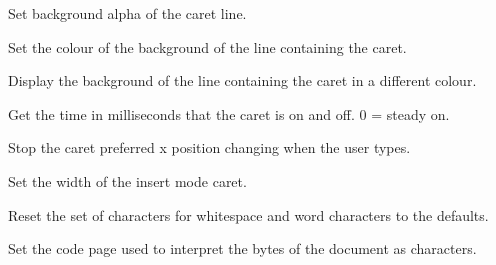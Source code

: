 
Set background alpha of the caret line.


\label{wxstyledtextctrlsetcaretlinebackground}


Set the colour of the background of the line containing the caret.


\label{wxstyledtextctrlsetcaretlinevisible}


Display the background of the line containing the caret in a different colour.


\label{wxstyledtextctrlsetcaretperiod}


Get the time in milliseconds that the caret is on and off. 0 = steady on.


\label{wxstyledtextctrlsetcaretsticky}


Stop the caret preferred x position changing when the user types.


\label{wxstyledtextctrlsetcaretwidth}


Set the width of the insert mode caret.


\label{wxstyledtextctrlsetcharsdefault}


Reset the set of characters for whitespace and word characters to the defaults.


\label{wxstyledtextctrlsetcodepage}


Set the code page used to interpret the bytes of the document as characters.


\label{wxstyledtextctrlsetcontrolcharsymbol}

